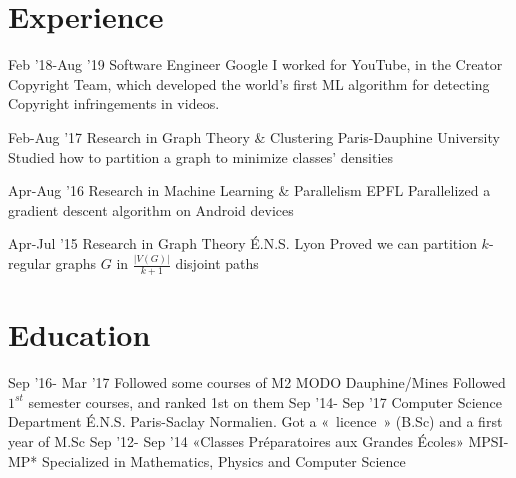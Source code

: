 \documentclass[letterpaper]{twentysecondcv} %
\newcommand\skills{ 
~
	\smartdiagram[bubble diagram]{
        \textbf{Algorithms},
        \textbf{Optimization},
        \textbf{Graph Theory},
        \textbf{Machine Learning}
    }
}
\begin{document}
\makeprofile %


      \hfill

    	\center


      \hfill


\section{Experience}

\begin{twenty} %
    \twentyitem
    	{Feb '18-Aug '19}
        {Software Engineer}
	{Google}
        {}
        {I worked for YouTube, in the Creator Copyright Team, which developed the world's first ML algorithm for detecting Copyright infringements in videos.}

    \twentyitem
    	{Feb-Aug '17}
        {Research in Graph Theory \& Clustering}
        {Paris-Dauphine University}
        {}
        {Studied how to partition a graph to minimize classes' densities}
        
    \twentyitem
   		{Apr-Aug '16}
        {Research in Machine Learning \& Parallelism}
        {EPFL}
        {}
        {Parallelized a gradient descent algorithm on Android devices}
        
     \twentyitem
   		{Apr-Jul '15}
        {Research in Graph Theory}
        {É.N.S. Lyon}
        {}
        {Proved we can partition $k$-regular graphs $G$ in $\frac{|V(G)|}{k+1}$ disjoint paths}
        
\end{twenty}



\section{Education}

\begin{twenty} %
	\twentyitem
    	{Sep '16- Mar '17}
	{Followed some courses of M2 MODO}
        {Dauphine/Mines}
        {}
	{Followed $1^{st}$ semester courses, and ranked 1st on them}
	\twentyitem
    	{Sep '14- Sep '17}
        {Computer Science Department}
        {É.N.S. Paris-Saclay}
        {}
	{Normalien. Got a « licence » (B.Sc) and a first year of M.Sc}
	\twentyitem
    	{Sep '12- Sep '14}
        {«Classes Préparatoires aux Grandes Écoles»}
        {MPSI-MP*}
        {}
        {Specialized in Mathematics, Physics and Computer Science}
\end{twenty}
\end{document}
